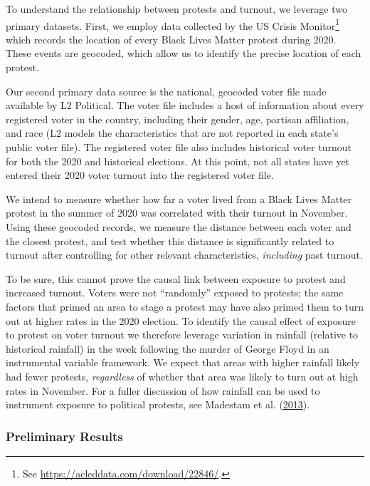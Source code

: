 \documentclass[
  12pt,
]{article}
\begin{document}
To understand the relationship between protests and turnout, we leverage two primary datasets. First, we employ data collected by the US Crisis Monitor\footnote{See \url{https://acleddata.com/download/22846/}.} which records the location of every Black Lives Matter protest during 2020. These events are geocoded, which allow us to identify the precise location of each protest.

Our second primary data source is the national, geocoded voter file made available by L2 Political. The voter file includes a host of information about every registered voter in the country, including their gender, age, partisan affiliation, and race (L2 models the characteristics that are not reported in each state's public voter file). The registered voter file also includes historical voter turnout for both the 2020 and historical elections. At this point, not all states have yet entered their 2020 voter turnout into the registered voter file.

We intend to measure whether how far a voter lived from a Black Lives Matter protest in the summer of 2020 was correlated with their turnout in November. Using these geocoded records, we measure the distance between each voter and the closest protest, and test whether this distance is significantly related to turnout after controlling for other relevant characteristics, \emph{including} past turnout.

To be sure, this cannot prove the causal link between exposure to protest and increased turnout. Voters were not ``randomly'' exposed to protests; the same factors that primed an area to stage a protest may have also primed them to turn out at higher rates in the 2020 election. To identify the causal effect of exposure to protest on voter turnout we therefore leverage variation in rainfall (relative to historical rainfall) in the week following the murder of George Floyd in an instrumental variable framework. We expect that areas with higher rainfall likely had fewer protests, \emph{regardless} of whether that area was likely to turn out at high rates in November. For a fuller discussion of how rainfall can be used to instrument exposure to political protests, see Madestam et al. (\protect\hyperlink{ref-Madestam2013}{2013}).

\hypertarget{preliminary-results}{%
\subsubsection*{Preliminary Results}\label{preliminary-results}}
\end{document}
